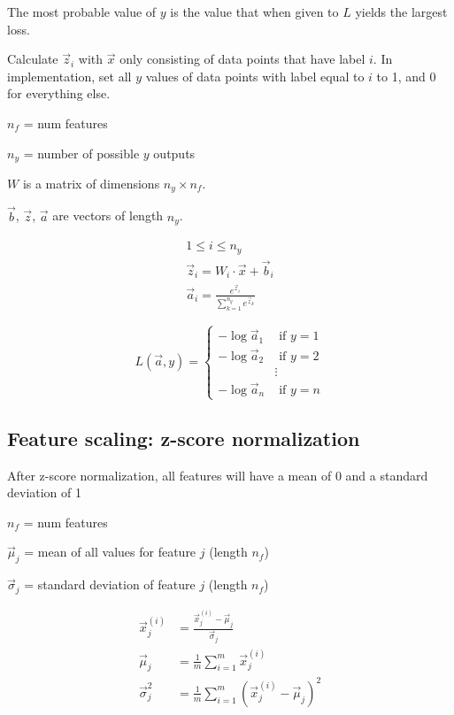 \documentclass[12pt]{article}
\begin{document}
The most probable value of $y$ is the value that when given to $L$ yields the largest loss.

Calculate $\vec{z}_i$ with $\vec{x}$ only consisting of data points that have label $i$. In implementation, set all $y$ values of data points with label equal to $i$ to 1, and 0 for everything else.

$n_f$ = num features

$n_y$ = number of possible $y$ outputs

$W$ is a matrix of dimensions $n_y \times n_f$.

$\vec{b}$, $\vec{z}$, $\vec{a}$ are vectors of length $n_y$.

\begin{gather*}
    1 \leq i \leq n_y\\
    \vec{z}_i = W_i \cdot \vec{x} + \vec{b}_i\\
    \vec{a}_i = \frac{e^{\vec{z}_i}}{\sum_{k=1}^{n_y} e^{\vec{z}_k}}
\end{gather*}

\begin{equation}
L(\vec{a}, y) =
  \left\{
    \begin{aligned}
    -\log \vec{a}_1 &\text{ if } y = 1\\
    -\log \vec{a}_2 &\text{ if } y = 2\\
    & \vdots\\
    -\log \vec{a}_n &\text{ if } y = n
    \end{aligned}
   \right.
\end{equation}

\subsection{Feature scaling: z-score normalization}

After z-score normalization, all features will have a mean of 0 and a standard deviation of 1

$n_f$ = num features

$\vec{\mu}_j$ = mean of all values for feature $j$ (length $n_f$)

$\vec{\sigma}_j$ = standard deviation of feature $j$ (length $n_f$)

\begin{align*}
    \vec{x}^{(i)}_j &= \frac{\vec{x}^{(i)}_j - \vec{\mu}_j}{\vec{\sigma}_j}\\
    \vec{\mu}_j &= \frac{1}{m} \sum_{i=1}^{m} \vec x^{(i)}_j\\
    \vec{\sigma}_j^2 &= \frac{1}{m} \sum_{i=1}^{m} (\vec x^{(i)}_j - \vec{\mu}_j)^2
\end{align*}
\end{document}

